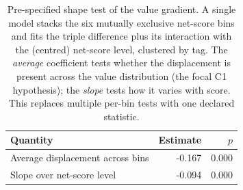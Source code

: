 \begin{table}[ht]
\centering
\caption{Pre-specified shape test of the value gradient. A single model stacks the six mutually exclusive net-score bins and fits the triple difference plus its interaction with the (centred) net-score level, clustered by tag. The \emph{average} coefficient tests whether the displacement is present across the value distribution (the focal C1 hypothesis); the \emph{slope} tests how it varies with score. This replaces multiple per-bin tests with one declared statistic.}
\label{tab:shape_test}
\small
\begin{tabular}{lrr}
\toprule
Quantity & Estimate & $p$ \\
\midrule
Average displacement across bins & -0.167 & 0.000 \\
Slope over net-score level & -0.094 & 0.000 \\
\bottomrule
\end{tabular}
\end{table}